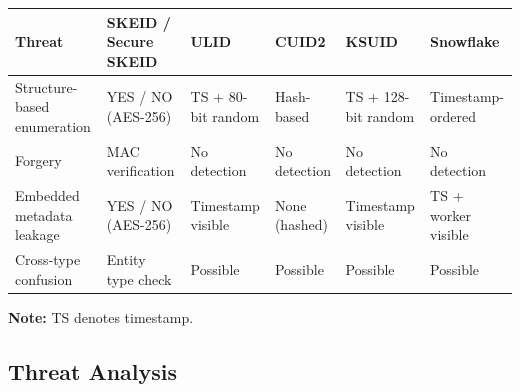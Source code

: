 \documentclass[fleqn,10pt]{wlpeerj}
\newcounter{none} %
\begin{document}
{\def\LTcaptype{none} %
\begin{longtable}[]{@{}
  >{\raggedright\arraybackslash}p{}
  >{\raggedright\arraybackslash}p{}
  >{\raggedright\arraybackslash}p{}
  >{\raggedright\arraybackslash}p{}
  >{\raggedright\arraybackslash}p{}
  >{\raggedright\arraybackslash}p{}@{}}
\toprule\noalign{}
\begin{minipage}[b]{\linewidth}\raggedright
Threat
\end{minipage} & \begin{minipage}[b]{\linewidth}\raggedright
SKEID / Secure SKEID
\end{minipage} & \begin{minipage}[b]{\linewidth}\raggedright
ULID
\end{minipage} & \begin{minipage}[b]{\linewidth}\raggedright
CUID2
\end{minipage} & \begin{minipage}[b]{\linewidth}\raggedright
KSUID
\end{minipage} & \begin{minipage}[b]{\linewidth}\raggedright
Snowflake
\end{minipage} \\
\midrule\noalign{}
\endhead
\bottomrule\noalign{}
\endlastfoot
Structure-based enumeration & YES / NO (AES-256) & TS + 80-bit random &
Hash-based & TS + 128-bit random & Timestamp-ordered \\
Forgery & MAC verification & No detection & No detection & No detection
& No detection \\
Embedded metadata leakage & YES / NO (AES-256) & Timestamp visible &
None (hashed) & Timestamp visible & TS + worker visible \\
Cross-type confusion & Entity type check & Possible & Possible &
Possible & Possible \\
\end{longtable}
}

\textbf{Note:} TS denotes timestamp.

\subsection{Threat Analysis}\label{threat-analysis}
\end{document}

